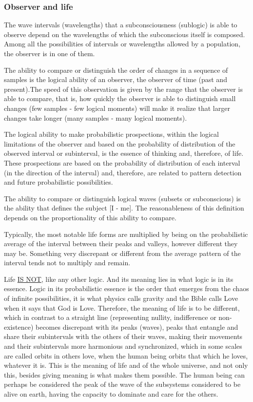 \subsubsection{Observer and life}
The wave intervals (wavelengths) that a subconsciousness (sublogic) is able to observe depend on the wavelengths of which the subconscious itself is composed. Among all the possibilities of intervals or wavelengths allowed by a population, the observer is in one of them. 

The ability to compare or distinguish the order of changes in a sequence of samples is the logical ability of an observer, the observer of time (past and present).The speed of this observation is given by the range that the observer is able to compare, that is, how quickly the observer is able to distinguish small changes (few samples - few logical moments) will make it realize that larger changes take longer (many samples - many logical moments).

The logical ability to make probabilistic prospections, within the logical limitations of the observer and based on the probability of distribution of the observed interval or subinterval, is the essence of thinking and, therefore, of life. These prospections are based on the probability of distribution of each interval (in the direction of the interval) and, therefore, are related to pattern detection and future probabilistic possibilities.

The ability to compare or distinguish logical waves (subsets or subconscious) is the ability that defines the subject [I - me]. The reasonableness of this definition depends on the proportionality of this ability to compare.

Typically, the most notable life forms are multiplied by being on the probabilistic average of the interval between their peaks and valleys, however different they may be. Something very discrepant or different from the average pattern of the interval tends not to multiply and remain.

Life \underline{IS NOT}, like any other logic. And its meaning lies in what logic is in its essence. Logic in its probabilistic essence is the order that emerges from the chaos of infinite possibilities, it is what physics calls gravity and the Bible calls Love when it says that God is Love. Therefore, the meaning of life is to be different, which in contrast to a straight line (representing nullity, indifference or non-existence) becomes discrepant with its peaks (waves), peaks that entangle and share their subintervals with the others of their waves, making their movements and their subintervals more harmonious and synchronized, which in some scales are called orbits in others love, when the human being orbits that which he loves, whatever it is. This is the meaning of life and of the whole universe, and not only this, besides giving meaning is what makes them possible. The human being can perhaps be considered the peak of the wave of the subsystems considered to be alive on earth, having the capacity to dominate and care for the others.

